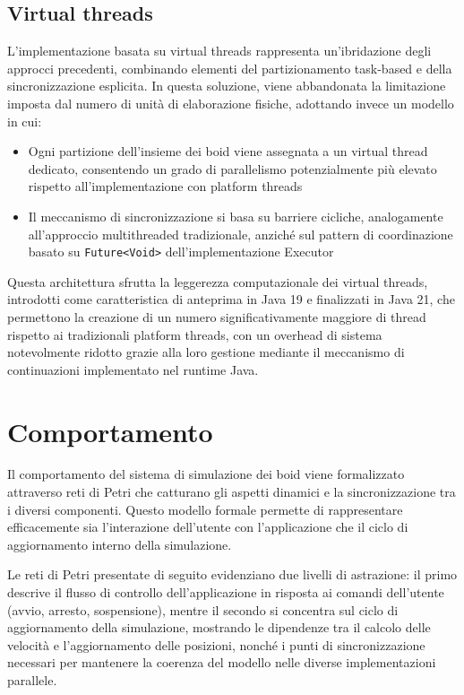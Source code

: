 \documentclass[a4paper,12pt]{report}
\begin{document}
    \section{Virtual threads}
        L'implementazione basata su virtual threads rappresenta un'ibridazione degli approcci precedenti, combinando elementi del partizionamento task-based e della sincronizzazione esplicita. In questa soluzione, viene abbandonata la limitazione imposta dal numero di unità di elaborazione fisiche, adottando invece un modello in cui:
        
        \begin{itemize}
            \item Ogni partizione dell'insieme dei boid viene assegnata a un virtual thread dedicato, consentendo un grado di parallelismo potenzialmente più elevato rispetto all'implementazione con platform threads
            \item Il meccanismo di sincronizzazione si basa su barriere cicliche, analogamente all'approccio multithreaded tradizionale, anziché sul pattern di coordinazione basato su \texttt{Future<Void>} dell'implementazione Executor
        \end{itemize}
        
        Questa architettura sfrutta la leggerezza computazionale dei virtual threads, introdotti come caratteristica di anteprima in Java 19 e finalizzati in Java 21, che permettono la creazione di un numero significativamente maggiore di thread rispetto ai tradizionali platform threads, con un overhead di sistema notevolmente ridotto grazie alla loro gestione mediante il meccanismo di continuazioni implementato nel runtime Java.
        
        
\chapter{Comportamento}
    Il comportamento del sistema di simulazione dei boid viene formalizzato attraverso reti di Petri che catturano gli aspetti dinamici e la sincronizzazione tra i diversi componenti. Questo modello formale permette di rappresentare efficacemente sia l'interazione dell'utente con l'applicazione che il ciclo di aggiornamento interno della simulazione.
    
    Le reti di Petri presentate di seguito evidenziano due livelli di astrazione: il primo descrive il flusso di controllo dell'applicazione in risposta ai comandi dell'utente (avvio, arresto, sospensione), mentre il secondo si concentra sul ciclo di aggiornamento della simulazione, mostrando le dipendenze tra il calcolo delle velocità e l'aggiornamento delle posizioni, nonché i punti di sincronizzazione necessari per mantenere la coerenza del modello nelle diverse implementazioni parallele.
    
\end{document}
